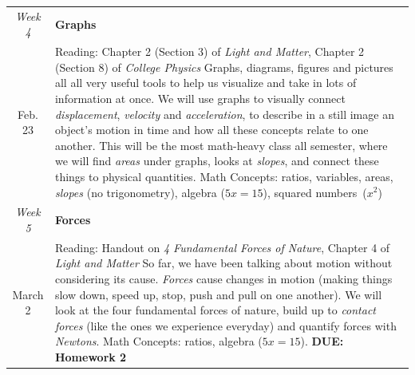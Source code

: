 \documentclass[12pt]{article}
\begin{document}
\begin{tabularx}{\textwidth}[c]{| c X |}
	\textit{Week 4} & \textbf{Graphs} \\ Feb. 23 & Reading: Chapter 2 (Section 3) of \textit{Light and Matter}, Chapter 2 (Section 8) of \textit{College Physics} \newline Graphs, diagrams, figures and pictures all all very useful tools to help us visualize and take in lots of information at once. We will use graphs to visually connect \textit{displacement}, \textit{velocity} and \textit{acceleration}, to describe in a still image an object's motion in time and how all these concepts relate to one another. This will be the most math-heavy class all semester, where we will find \textit{areas} under graphs, looks at \textit{slopes}, and connect these things to physical quantities. \newline Math Concepts: ratios, variables, areas, \textit{slopes} (no trigonometry), algebra ($5x=15$), squared numbers~($x^2$)\\ \hline
	\textit{Week 5} & \textbf{Forces} \\ March 2 & Reading: Handout on \textit{4 Fundamental Forces of Nature}, Chapter 4 of \textit{Light and Matter} \newline So far, we have been talking about motion without considering its cause. \textit{Forces} cause changes in motion (making things slow down, speed up, stop, push and pull on one another). We will look at the four fundamental forces of nature, build up to \textit{contact forces} (like the ones we experience everyday) and quantify forces with \textit{Newtons}. \newline Math Concepts: ratios, algebra ($5x=15$). \newline \textbf{DUE: Homework 2}\\ \hline
\end{tabularx}
\end{document}
